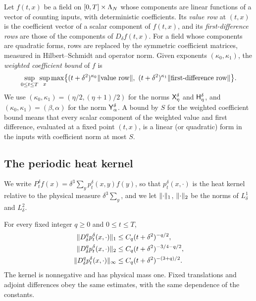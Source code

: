 Let $f(t,x)$ be a field on $[0,T]\times\Lambda_{N}$ whose components are linear functions of a vector of counting inputs, with deterministic coefficients. Its \emph{value row} at $(t,x)$ is the coefficient vector of a scalar component of $f(t,x)$, and its \emph{first-difference rows} are those of the components of $D_\delta f(t,x)$. For a field whose components are quadratic forms, rows are replaced by the symmetric coefficient matrices, measured in Hilbert--Schmidt and operator norm. Given exponents $(\kappa_0,\kappa_1)$, the \emph{weighted coefficient bound} of $f$ is
\[
 \sup_{0\le t\le T}\sup_x\max\bigl\{(t+\delta^2)^{\kappa_0}\norm{\text{value row}},\ (t+\delta^2)^{\kappa_1}\norm{\text{first-difference row}}\bigr\}.
\]
We use $(\kappa_0,\kappa_1)=(\eta/2,(\eta+1)/2)$ for the norms $\mathsf X_{\eta}^{\delta}$ and $\mathsf H_{\eta}^{\delta}$, and $(\kappa_0,\kappa_1)=(\beta,\alpha)$ for the norm $\mathsf Y_{\alpha}^{\delta}$. A bound by $S$ for the weighted coefficient bound means that every scalar component of the weighted value and first difference, evaluated at a fixed point $(t,x)$, is a linear (or quadratic) form in the inputs with coefficient norm at most $S$.

\subsection{The periodic heat kernel}

We write $P_t^\delta f(x)=\delta^3\sum_yp_t^\delta(x,y)f(y)$, so that $p_t^\delta(x,\cdot)$ is the heat kernel relative to the physical measure $\delta^3\sum_y$, and we let $\lVert \cdot\rVert_1$, $\lVert \cdot\rVert_2$ be the norms of $L^1_\delta$ and $L^2_\delta$.

\begin{lemma}\label{ch23:lem:physical-heat}
For every fixed integer $q\ge0$ and $0\le t\le T$,
\begin{align*}
 \lVert D_\delta^qp_t^\delta(x,\cdot)\rVert_1&\le C_q(t+\delta^2)^{-q/2},\\
 \lVert D_\delta^qp_t^\delta(x,\cdot)\rVert_2&\le C_q(t+\delta^2)^{-3/4-q/2},\\
 \lVert D_\delta^qp_t^\delta(x,\cdot)\rVert_\infty&\le C_q(t+\delta^2)^{-(3+q)/2}.
\end{align*}
The kernel is nonnegative and has physical mass one. Fixed translations and adjoint differences obey the same estimates, with the same dependence of the constants.
\end{lemma}


